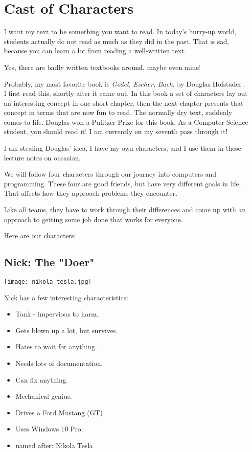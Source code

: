 \chapter{Cast of Characters}

I want my text to be something you want to read. In today's hurry-up
world, students actually do not read as much as they did in the past. That is
sad, because you can learn a lot from reading a well-written text.

Yes, there are badly written textbooks around, maybe even mine!

Probably, my most favorite book is {\it{Godel, Escher, Bach}}, by Douglas Hofstader
\cite{Hofstadter:1999}. I first read this, shortly after it came out. In this
book a set of characters lay out an interesting concept in one short chapter,
then the next chapter presents that concept in terms that are now fun to read.
The normally dry text, suddenly comes to life. Douglas won a Pulitzer Prize for
this book, As a Computer Science student, you should read it! I am currently on
my seventh pass through it!

I am stealing Douglas' idea, I have my own characters, and I use them in
these lecture notes on occasion.

We will follow four characters through our journey into computers and
programming. These four are good friends, but have very different goals in
life. That affects how they approach problems they encounter.

Like all teams, they have to work through their differences and come up with an
approach to getting some job done that works for everyone.

Here are our characters:

\section{Nick:   The "Doer"}

\texttt{[image: nikola-tesla.jpg]}

Nick has a few interesting characteristics:

\begin{itemize}
    \item{Tank - impervious to harm.} 
    \item{Gets blown up a lot, but survives.}
    \item{Hates to wait for anything.}
    \item{Needs lots of documentation.}
    \item{Can fix anything.}
    \item{Mechanical genius.}
    \item{Drives a Ford Mustang (GT)}
    \item{Uses Windows 10 Pro.}
    \item{named after: Nikola Tesla}
\end{itemize}
    


